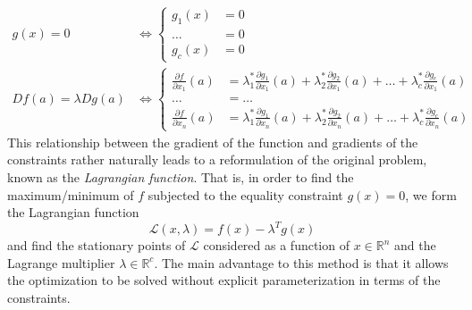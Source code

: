 	\begin{align}
		g(x) = 0 & \iff \begin{cases}
			g_1 (x) & = 0 \\
			\ldots & = 0 \\
			g_c (x) & = 0
		\end{cases} \\ 
		Df(a) = \lambda Dg(a) & \iff \begin{cases}
			\frac{\partial f}{\partial x_1} (a) & = \lambda^*_1 \frac{\partial g_1}{\partial x_1} (a) + \lambda^*_2 \frac{\partial g_2}{\partial x_1} (a) + \ldots + \lambda^*_c \frac{\partial g_c}{\partial x_1} (a) \\
			\ldots & = \ldots \\
			\frac{\partial f}{\partial x_n} (a) & = \lambda^*_1 \frac{\partial g_1}{\partial x_n} (a) + \lambda^*_2 \frac{\partial g_2}{\partial x_n} (a) + \ldots + \lambda^*_c \frac{\partial g_c}{\partial x_n} (a) 
		\end{cases}
	\end{align} 
	This relationship between the gradient of the function and gradients of the constraints rather naturally leads to a reformulation of the original problem, known as the \textit{Lagrangian function}. That is, in order to find the maximum/minimum of $f$ subjected to the equality constraint $g(x) = 0$, we form the Lagrangian function
	\begin{equation}
  	\mathcal{L}(x, \lambda) = f(x) - \lambda^T g(x)
	\end{equation}
	and find the stationary points of $\mathcal{L}$ considered as a function of $x \in \mathbb{R}^n$ and the Lagrange multiplier $\lambda \in \mathbb{R}^c$. The main advantage to this method is that it allows the optimization to be solved without explicit parameterization in terms of the constraints. 

